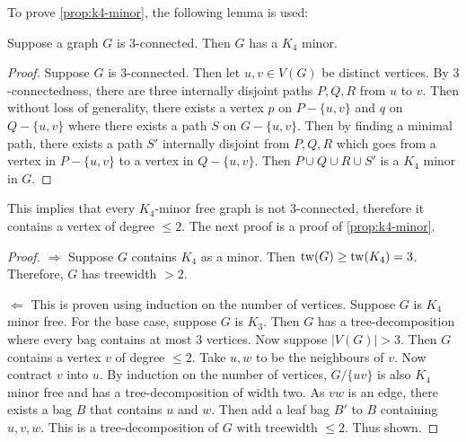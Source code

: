 To prove \cref{prop:k4-minor}, the following lemma is used:
\begin{lemma}
	Suppose a graph $G$ is $3$-connected. Then $G$ has a $K_4$ minor. 
\end{lemma}
\begin{proof}
	Suppose $G$ is $3$-connected. Then let $u, v \in V(G)$ be distinct vertices. By $3$-connectedness, there are three internally disjoint paths $P, Q, R$ from $u$ to $v$. Then without loss of generality, there exists a vertex $p$ on $P -\{u, v\}$ and $q$ on $Q -\{u, v\}$ where there exists a path $S$ on $G - \{u, v\}$. Then by finding a minimal path, there exists a path $S'$ internally disjoint from $P, Q, R$ which goes from a vertex in $P - \{u, v\}$ to a vertex in $Q - \{u, v\}$. Then $P \cup Q \cup R \cup S'$ is a $K_4$ minor in $G$. 
\end{proof}

This implies that every $K_4$-minor free graph is not $3$-connected, therefore it contains a vertex of degree $\leq 2$. The next proof is a proof of \cref{prop:k4-minor}.

\begin{proof}
	$\Rightarrow$ Suppose $G$ contains $K_4$ as a minor. Then $\operatorname{tw}(G) \geq \operatorname{tw}(K_4) = 3$. Therefore, $G$ has treewidth $> 2$. 

	$\Leftarrow$ This is proven using induction on the number of vertices. Suppose $G$ is $K_4$ minor free. For the base case, suppose $G$ is $K_3$. Then $G$ has a tree-decomposition where every bag contains at most $3$ vertices. Now suppose $|V(G)| > 3$. Then $G$ contains a vertex $v$ of degree $\leq 2$. Take $u, w$ to be the neighbours of $v$. Now contract $v$ into $u$. By induction on the number of vertices, $G / \{uv\}$ is also $K_4$ minor free and has a tree-decomposition of width two. As $vw$ is an edge, there exists a bag $B$ that contains $u$ and $w$. Then add a leaf bag $B'$ to $B$ containing $u, v, w$. This is a tree-decomposition of $G$ with treewidth $\leq 2$. Thus shown. 
\end{proof}


